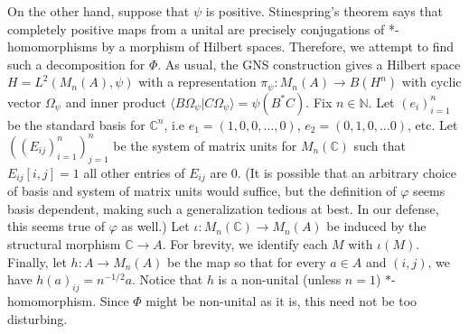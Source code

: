 \documentclass[a4paper,10pt]{report}
\newcommand{\ggen}[1]{\langle#1\rangle}
\newcommand{\N}{\mathbb{N}}
\newcommand{\C}{\mathbb{C}}
\begin{document}
\begin{enumerate}
\begin{enumerate}
				On the other hand, suppose that $\psi$ is positive. 
				Stinespring's theorem says that completely positive maps from a unital {\csa} are precisely conjugations of *-homomorphisms by a morphism of Hilbert spaces. Therefore, we attempt to find such a decomposition for $\Phi$. 
				As usual, the GNS construction gives a Hilbert space $H=L^2(M_n(A),\psi)$ with a representation $\pi_\psi:M_n(A)\to B(H^n)$ with cyclic vector $\Omega_\psi$ and inner product $\ggen{B\Omega_\psi|C\Omega_\psi}=\psi(B^*C)$. 
				Fix $n\in\N$. Let $(e_i)_{i=1}^n$ be the standard basis for $\C^n$, i.e $e_1=(1,0,0,\ldots, 0)$, $e_2=(0,1,0,\ldots 0)$, etc. Let $((E_{ij})_{i=1}^n)_{j=1}^n$ be the system of matrix units for $M_n(\C)$ such that $E_{ij}[i,j]=1$ all other entries of $E_{ij}$ are $0$.
				(It is possible that an arbitrary choice of basis and system of matrix units would suffice, but the definition of $\varphi$ seems basis dependent, making such a generalization tedious at best. In our defense, this seems true of $\varphi$ as well.)
				Let $\iota:M_n(\C)\to M_n(A)$ be induced by the structural morphism $\C\to A$. For brevity, we identify each $M$ with $\iota(M)$. Finally, let $h:A\to M_n(A)$ be the map so that for every $a\in A$ and $(i,j)$, we have $h(a)_{ij}=n^{-1/2}a$. Notice that $h$ is a non-unital (unless $n=1$) $*$-homomorphism. Since $\Phi$ might be non-unital as it is, this need not be too disturbing. 
				

\end{enumerate}
\end{enumerate}
\end{document}
